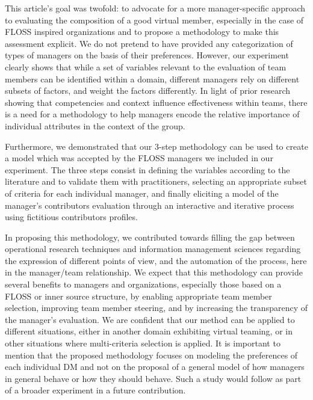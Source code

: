 This article's goal was twofold: to advocate for a more manager-specific approach to evaluating the composition of a good virtual member, especially in the case of FLOSS inspired organizations and to propose a methodology to make this assessment explicit. We do not pretend to have provided any categorization of types of managers on the basis of their preferences. However, our experiment clearly shows that while a set of variables relevant to the evaluation of team members can be identified within a domain, different managers rely on different subsets of factors, and weight the factors differently. In light of prior research showing that competencies and context influence effectiveness within teams, there is a need for a methodology to help managers encode the relative importance of individual attributes in the context of the group.

Furthermore, we demonstrated that our 3-step methodology can be used to create a model which was accepted by the FLOSS managers we included in our experiment. The three steps consist in defining the variables according to the literature and to validate them with practitioners, selecting an appropriate subset of criteria for each individual manager, and finally eliciting a model of the manager's contributors evaluation through an interactive and iterative process using fictitious contributors profiles.

In proposing this methodology, we contributed towards filling the gap between operational research techniques and information management sciences regarding the expression of different points of view, and the automation of the process, here in the manager/team relationship. We expect that this methodology can provide several benefits to managers and organizations, especially those based on a FLOSS or inner source structure, by enabling appropriate team member selection, improving team member steering, and by increasing the transparency of the manager's evaluation. We are confident that our method can be applied to different situations, either in another domain exhibiting virtual teaming, or in other situations where multi-criteria selection is applied. It is important to mention that the proposed methodology focuses on modeling the preferences of each individual DM and not on the proposal of a general model of how managers in general behave or how they should behave. Such a study would follow as part of a broader experiment in a future contribution.

